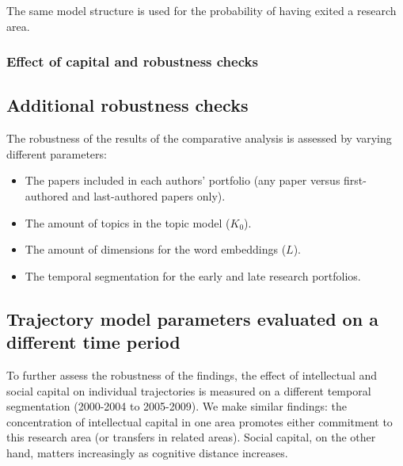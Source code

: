 \documentclass{article}
\begin{document}
The same model structure is used for the probability of having exited a research area.

\subsubsection{\label{appendix:robustness}Effect of capital and robustness checks}





\subsection{\label{section:robustness}Additional robustness checks}

The robustness of the results of the comparative analysis is assessed by varying different parameters:

\begin{itemize}
    \item The papers included in each authors' portfolio (any paper versus first-authored and last-authored papers only).
    \item The amount of topics in the topic model ($K_0$).
    \item The amount of dimensions for the word embeddings ($L$).
    \item The temporal segmentation for the early and late research portfolios.
\end{itemize}



\subsection{\label{appendix:model_parameters}Trajectory model parameters evaluated on a different time period}

To further assess the robustness of the findings, the effect of intellectual and social capital on individual trajectories is measured on a different temporal segmentation (2000-2004 to 2005-2009). We make similar findings: the concentration of intellectual capital in one area promotes either commitment to this research area (or transfers in related areas). Social capital, on the other hand, matters increasingly as cognitive distance increases.
\end{document}
